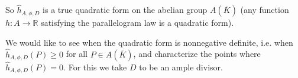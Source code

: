 \documentclass{article}
\theoremstyle{definition}
\newcommand{\RR}{\mathbb{R}}
\begin{document}
So $\widehat{h}_{A,\phi,D}$ is a true quadratic form on the abelian group
$A (\overline{K})$ (any function $h\colon A\to \RR$ satisfying the parallelogram
law is a quadratic form).



We would like to see when the quadratic form is nonnegative definite, i.e. when
$\widehat{h}_{A,\phi,D} (P) \ge 0$ for all $P \in A (\overline{K})$, and
characterize the points where $\widehat{h}_{A,\phi,D} (P) = 0$. For this we take
$D$ to be an ample divisor.
\end{document}
